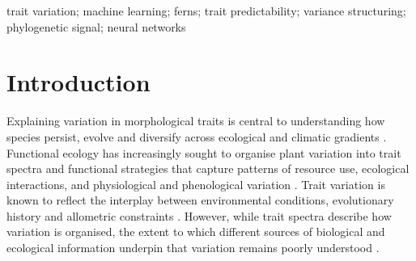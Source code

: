 \documentclass[preprint,12pt,authoryear]{elsarticle}
\begin{document}
\begin{frontmatter}
\begin{highlights}
\end{highlights}

\begin{keyword}
trait variation; machine learning; ferns; trait predictability; variance structuring; phylogenetic signal; neural networks


\end{keyword}

\end{frontmatter}



\section{Introduction}
Explaining variation in morphological traits is central to understanding how species persist, evolve and diversify across ecological and climatic gradients \citep{adler_functional_2014,westoby_land-plant_2006}. Functional ecology has increasingly sought to organise plant variation into trait spectra and functional strategies that capture patterns of resource use, ecological interactions, and physiological and phenological variation \citep{diaz_global_2016, heilmeier2019functional, laughlin2023plant, majumder2024machine, mommer2012role, roddy2020towards, sanchezmartinez2020adaptation, walker2022functional, westoby1998leafheightseed, wright2004worldwide}. Trait variation is known to reflect the interplay between environmental conditions, evolutionary history and allometric constraints \citep{ciarle2025disentangling, flo2021climate, mencuccini2019leaf, niklas1994plant, sanchezmartinez2024framework}. However, while trait spectra describe how variation is organised, the extent to which different sources of biological and ecological information underpin that variation remains poorly understood \citep{caruso2020evolution}.
\end{document}
